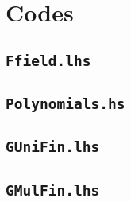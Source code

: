 \documentclass[11pt]{book}
\begin{document}

\chapter{Codes}
\section{\texttt{Ffield.lhs}}


\section{\texttt{Polynomials.hs}}


\section{\texttt{GUniFin.lhs}}



\section{\texttt{GMulFin.lhs}}

\end{document}
